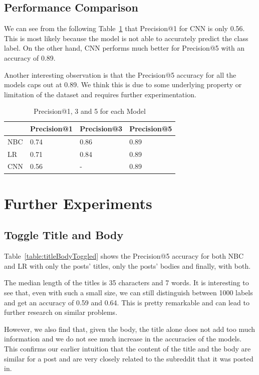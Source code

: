 \documentclass{sig-alternate-05-2015}
\begin{document}
\subsection{Performance Comparison}

We can see from the following Table~\ref{table:performanceComparison} that Precision@1 for CNN is only 0.56. This is most likely because the model is not able to accurately predict the class label. On the other hand, CNN performs much better for Precision@5 with an accuracy of 0.89.

Another interesting observation is that the Precision@5 accuracy for all the models caps out at 0.89. We think this is due to some underlying property or limitation of the dataset and requires further experimentation.

\begin{table}[H]
\begin{tabular}{|l|l|l|l|}
\hline
    & Precision@1 & Precision@3 & Precision@5 \\ \hline
NBC & 0.74        & 0.86        & 0.89        \\ \hline
LR  & 0.71        & 0.84        & 0.89       \\ \hline
CNN & 0.56        & -           & 0.89        \\ \hline
\end{tabular}
\caption{Precision@1, 3 and 5 for each Model}
\label{table:performanceComparison}
\end{table}

\section{Further Experiments}
\subsection{Toggle Title and Body}

Table~\ref{table:titleBodyToggled} shows the Precision@5 accuracy for both NBC and LR with only the posts' titles, only the posts' bodies and finally, with both.

The median length of the titles is 35 characters and 7 words. It is interesting to see that, even with such a small size, we can still distinguish between 1000 labels and get an accuracy of 0.59 and 0.64. This is pretty remarkable and can lead to further research on similar problems.

However, we also find that, given the body, the title alone does not add too much information and we do not see much increase in the accuracies of the models. This confirms our earlier intuition that the content of the title and the body are similar for a post and are very closely related to the subreddit that it was posted in.
\end{document}
